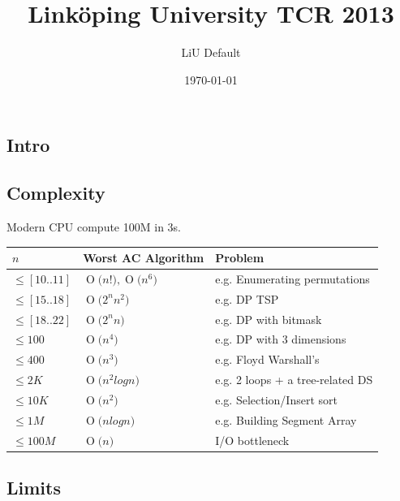 \documentclass[a4paper,landscape,8pt]{article}
\newcommand{\BigO}[1]{\ensuremath{\operatorname{O}\bigl(#1\bigr)}}
\begin{document}
\title{Linköping University TCR 2013}
\author{LiU Default}
\date{\today}
\maketitle
\pagebreak

\thispagestyle{tcr}
\pagestyle{tcr}

\begin{multicols}{2}
\makeatletter
{}
\makeatother

\section{Intro}

\subsection{Complexity}

Modern CPU compute 100M in 3s.

\begin{center}
    \begin{tabular}{ l l p{5cm}}
    \hline
    $n$             &   Worst AC Algorithm              & Problem \\ \hline
    $\leq [10..11]$ &   $\BigO{n!}, \BigO{n^6}$        & e.g. Enumerating permutations \\
    $\leq [15..18]$ &   $\BigO{2^n n^2} $              & e.g. DP TSP\\
    $\leq [18..22]$ &   $\BigO{2^n n} $                & e.g. DP with bitmask \\
    $\leq 100$      &   $\BigO{n^4} $                  & e.g. DP with 3 dimensions \\
    $\leq 400$      &   $\BigO{n^3} $                  & e.g. Floyd Warshall's \\
    $\leq 2K$       &   $\BigO{n^2 log n} $            & e.g. 2 loops + a tree-related DS \\
    $\leq 10K$      &   $\BigO{n^2} $                  & e.g. Selection/Insert sort \\
    $\leq 1M$       &   $\BigO{n log n} $              & e.g. Building Segment Array  \\
    $\leq 100M$     &   $\BigO{n} $                    & I/O bottleneck \\
    \end{tabular}
\end{center}

\subsection{Limits}


\end{multicols}
\end{document}

